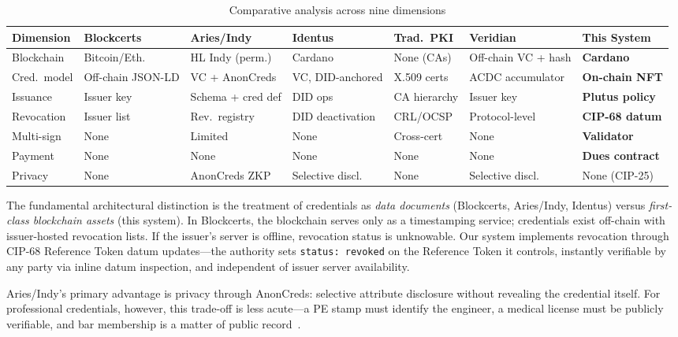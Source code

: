 \documentclass[conference,10pt]{IEEEtran}
\begin{document}
\begin{table}[t]
\centering
\caption{Comparative analysis across nine dimensions}
\label{tab:comparison}
\scriptsize
\begin{tabular}{@{}L{1.6cm}L{1.8cm}L{1.8cm}L{1.8cm}L{1.7cm}L{1.8cm}L{1.8cm}@{}}
\toprule
\textbf{Dimension} & \textbf{Blockcerts} & \textbf{Aries/Indy} & \textbf{Identus} & \textbf{Trad.\ PKI} & \textbf{Veridian} & \textbf{This System} \\
\midrule
Blockchain & Bitcoin/Eth. & HL Indy (perm.) & Cardano & None (CAs) & Off-chain VC + hash & \textbf{Cardano} \\
Cred.\ model & Off-chain JSON-LD & VC + AnonCreds & VC, DID-anchored & X.509 certs & ACDC accumulator & \textbf{On-chain NFT} \\
Issuance & Issuer key & Schema + cred def & DID ops & CA hierarchy & Issuer key & \textbf{Plutus policy} \\
Revocation & Issuer list & Rev.\ registry & DID deactivation & CRL/OCSP & Protocol-level & \textbf{CIP-68 datum} \\
Multi-sign & None & Limited & None & Cross-cert & None & \textbf{Validator} \\
Payment & None & None & None & None & None & \textbf{Dues contract} \\
Privacy & None & AnonCreds ZKP & Selective discl. & None & Selective discl. & None (CIP-25) \\
\bottomrule
\end{tabular}
\end{table}

The fundamental architectural distinction is the treatment of credentials as \emph{data documents} (Blockcerts, Aries/Indy, Identus) versus \emph{first-class blockchain assets} (this system). In Blockcerts, the blockchain serves only as a timestamping service; credentials exist off-chain with issuer-hosted revocation lists. If the issuer's server is offline, revocation status is unknowable. Our system implements revocation through CIP-68 Reference Token datum updates---the authority sets \texttt{status: revoked} on the Reference Token it controls, instantly verifiable by any party via inline datum inspection, and independent of issuer server availability.

Aries/Indy's primary advantage is privacy through AnonCreds: selective attribute disclosure without revealing the credential itself. For professional credentials, however, this trade-off is less acute---a PE stamp must identify the engineer, a medical license must be publicly verifiable, and bar membership is a matter of public record~\cite{hyperledger2024}.
\end{document}
